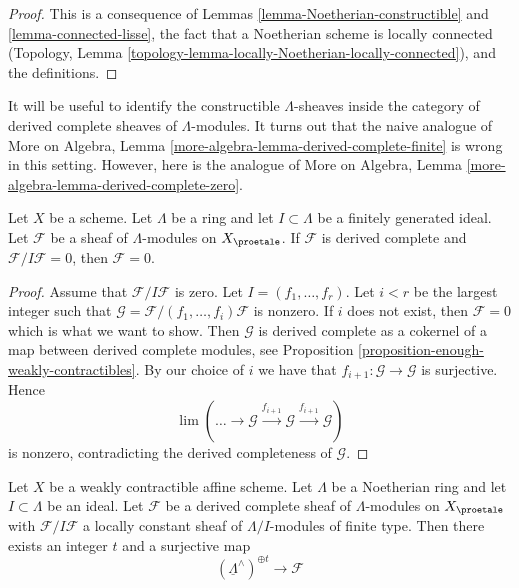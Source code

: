 \begin{proof}
This is a consequence of Lemmas \ref{lemma-Noetherian-constructible} and
\ref{lemma-connected-lisse}, the fact that a Noetherian scheme
is locally connected
(Topology, Lemma \ref{topology-lemma-locally-Noetherian-locally-connected}),
and the definitions.
\end{proof}

\noindent
It will be useful to identify the constructible $\Lambda$-sheaves
inside the category of derived complete sheaves of $\Lambda$-modules.
It turns out that the naive analogue of
More on Algebra, Lemma \ref{more-algebra-lemma-derived-complete-finite}
is wrong in this setting. However, here
is the analogue of More on Algebra, Lemma
\ref{more-algebra-lemma-derived-complete-zero}.

\begin{lemma}
\label{lemma-derived-complete-zero}
Let $X$ be a scheme. Let $\Lambda$ be a ring and let
$I \subset \Lambda$ be a finitely generated ideal.
Let $\mathcal{F}$ be a sheaf of $\Lambda$-modules on $X_\proetale$.
If $\mathcal{F}$ is derived complete and $\mathcal{F}/I\mathcal{F} = 0$,
then $\mathcal{F} = 0$.
\end{lemma}

\begin{proof}
Assume that $\mathcal{F}/I\mathcal{F}$ is zero.
Let $I = (f_1, \ldots, f_r)$. Let $i < r$ be the largest
integer such that $\mathcal{G} = \mathcal{F}/(f_1, \ldots, f_i)\mathcal{F}$
is nonzero. If $i$ does not exist, then $\mathcal{F} = 0$ which is what we
want to show. Then $\mathcal{G}$ is derived complete as a cokernel
of a map between derived complete modules, see
Proposition \ref{proposition-enough-weakly-contractibles}.
By our choice of $i$ we have that $f_{i + 1} : \mathcal{G} \to \mathcal{G}$
is surjective. Hence
$$
\lim (\ldots \to \mathcal{G} \xrightarrow{f_{i + 1}} \mathcal{G}
\xrightarrow{f_{i + 1}} \mathcal{G})
$$
is nonzero, contradicting the derived completeness of $\mathcal{G}$.
\end{proof}

\begin{lemma}
\label{lemma-derived-complete-limit}
Let $X$ be a weakly contractible affine scheme.
Let $\Lambda$ be a Noetherian ring and let $I \subset \Lambda$ be an ideal.
Let $\mathcal{F}$ be a derived complete sheaf of $\Lambda$-modules
on $X_\proetale$ with $\mathcal{F}/I\mathcal{F}$ a locally
constant sheaf of $\Lambda/I$-modules of finite type.
Then there exists an integer $t$ and a surjective map
$$
(\underline{\Lambda}^\wedge)^{\oplus t} \to \mathcal{F}
$$
\end{lemma}

